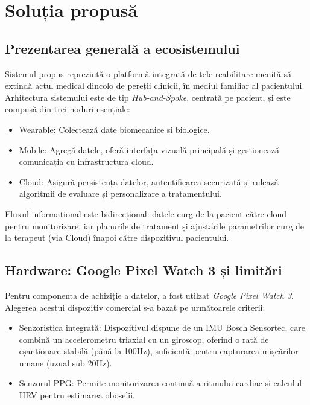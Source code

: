 \chapter{Soluția propusă}

\section{Prezentarea generală a ecosistemului}
\hspace{0.75cm}Sistemul propus reprezintă o platformă integrată de tele-reabilitare menită să extindă actul medical dincolo de pereții clinicii, 
în mediul familiar al pacientului. 
Arhitectura sistemului este de tip \textit{Hub-and-Spoke}, centrată pe pacient, și este compusă din trei noduri esențiale:
\begin{itemize}
\item Wearable: Colectează date biomecanice si biologice.
\item Mobile: Agregă datele, oferă interfața vizuală principală și gestionează comunicația cu infrastructura cloud.
\item Cloud: Asigură persistența datelor, autentificarea securizată și rulează algoritmii de evaluare și personalizare a tratamentului.
\end{itemize}

Fluxul informațional este bidirecțional: datele curg de la pacient către cloud pentru monitorizare, iar planurile de tratament și ajustările parametrilor curg de la terapeut (via Cloud) înapoi către dispozitivul pacientului.

\section{Hardware: Google Pixel Watch 3 și limitări}
\hspace{0.75cm}Pentru componenta de achiziție a datelor, a fost utilzat \textit{Google Pixel Watch 3}. Alegerea acestui dispozitiv comercial s-a bazat pe următoarele criterii:
\begin{itemize}
    \item Senzoristica integrată: Dispozitivul dispune de un IMU Bosch Sensortec, 
    care combină un accelerometru triaxial cu un giroscop, oferind o rată de eșantionare stabilă (până la 100Hz), suficientă pentru capturarea mișcărilor 
    umane (uzual sub 20Hz).
    \item Senzorul PPG: Permite monitorizarea continuă a ritmului cardiac și calculul HRV pentru estimarea oboselii.
\end{itemize}

